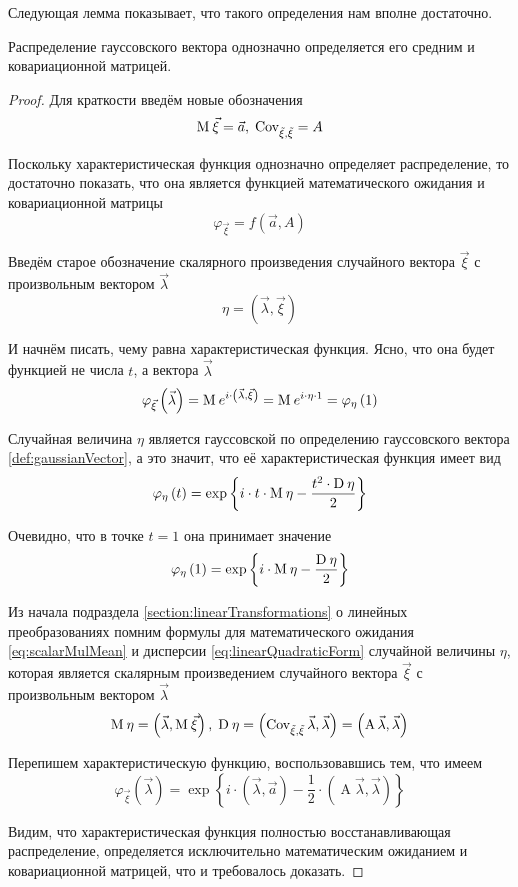 Следующая лемма показывает, что такого определения нам вполне достаточно.

\begin{lemma}\label{lemma:gaussianVector:characteristicFunction}
  Распределение гауссовского вектора однозначно определяется его средним и
  ковариационной матрицей.
\end{lemma}
\begin{proof}
  Для краткости введём новые обозначения
  $$\operatorname{M}_{} \vec{\xi} = \vec{a},\; \operatorname{Cov^{}_{\vec{\xi}, \vec{\xi}}} = A$$

  Поскольку характеристическая функция однозначно определяет распределение,
  то достаточно показать, что она является функцией математического ожидания
  и ковариационной матрицы
  $$\varphi_{\vec{\xi}} = f\left( \vec{a}, A \right)$$

  Введём старое обозначение скалярного произведения случайного вектора
  $\vec{\xi}$ с произвольным вектором $\vec{\lambda}$
  $$\eta = \left( \vec{\lambda}, \vec{\xi} \right)$$

  И начнём писать, чему равна характеристическая функция. Ясно, что она будет
  функцией не числа $t$, а вектора $\vec{\lambda}$
  $$\varphi_{\vec{\xi}}\left( \vec{\lambda} \right)
      = \operatorname{M}_{} e^{i \cdot \left( \vec{\lambda}, \vec{\xi} \right)}
      = \operatorname{M}_{} e^{i \cdot \eta \cdot 1}
      = \varphi_{\eta}\left( 1 \right)$$

  Случайная величина $\eta$ является гауссовской по определению гауссовского
  вектора \ref{def:gaussianVector}, а это значит, что её характеристическая
  функция имеет вид
  $$\varphi_{\eta}\left( t \right)
      = \exp{\left\{ i \cdot t \cdot \operatorname{M}_{} \eta
      - \frac{t^2 \cdot \operatorname{D}_{} \eta}{2} \right\}}$$

  Очевидно, что в точке $t=1$ она принимает значение
  $$\varphi_{\eta}\left( 1 \right)
      = \exp{\left\{ i \cdot \operatorname{M}_{} \eta
      - \frac{\operatorname{D}_{} \eta}{2} \right\}}$$

  Из начала подраздела \ref{section:linearTransformations} о линейных
  преобразованиях помним формулы для математического ожидания
  \eqref{eq:scalarMulMean} и дисперсии \eqref{eq:linearQuadraticForm}
  случайной величины $\eta$, которая является скалярным произведением
  случайного вектора $\vec{\xi}$ с произвольным вектором $\vec{\lambda}$
  $$\operatorname{M}_{} \eta = \left( \vec{\lambda}, \operatorname{M}_{} \vec{\xi} \right),\;
      \operatorname{D}_{} \eta
      = \left( \operatorname{\operatorname{Cov^{}_{\vec{\xi}, \vec{\xi}}}} \vec{\lambda} ,
          \vec{\lambda} \right)
      = \left( \operatorname{A} \vec{\lambda} ,
          \vec{\lambda} \right)$$

  Перепишем характеристическую функцию, воспользовавшись тем, что имеем
  $$\varphi_{\vec{\xi}}\left( \vec{\lambda} \right)
      = \exp{\left\{ i \cdot \left( \vec{\lambda}, \vec{a} \right)
      - \frac{1}{2} \cdot \left( \operatorname{A} \vec{\lambda} ,
          \vec{\lambda} \right) \right\}}$$

  Видим, что характеристическая функция полностью восстанавливающая
  распределение, определяется исключительно математическим ожиданием
  и ковариационной матрицей, что и требовалось доказать.
\end{proof}

